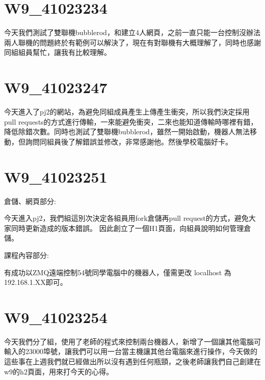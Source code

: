 \documentclass{report}
\begin{document}
\section{W9\_41023234}

今天我們測試了雙聯機bubblerod，和建立4人網頁，之前一直只能一台控制沒辦法兩人聯機的問題終於有範例可以解決了，現在有對聯機有大概理解了，同時也感謝同組組員幫忙，讓我有比較理解。

\section{W9\_41023247}

今天進入了pj2的網站，為避免同組成員產生上傳產生衝突，所以我們決定採用pull requests的方式進行傳輸，一來能避免衝突，二來也能知道傳輸時哪裡有錯，降低除錯次數。同時也測試了雙聯機bubblerod，雖然一開始啟動，機器人無法移動，但詢問同組員後了解錯誤並修改，非常感謝他。然後學校電腦好卡。

\section{W9\_41023251}

倉儲、網頁部分:

今天進入pj2，我們組這別次決定各組員用fork倉儲再pull request的方式，避免大家同時更新造成的版本錯誤。
因此創立了一個H1頁面，向組員說明如何管理倉儲。


課程內容部分:

有成功以ZMQ遠端控制54號同學電腦中的機器人，僅需更改 localhost 為192.168.1.XX即可。

\section{W9\_41023254}

今天我們分了組，使用了老師的程式來控制兩台機器人，新增了一個讓其他電腦可輸入的23000埠號，讓我們可以用一台當主機讓其他台電腦來進行操作，今天做的這些事在上週我們就已經做出所以沒有遇到任何瓶頸，之後老師讓我們自己創建在w9的h2頁面，用來打今天的心得。
\end{document}
